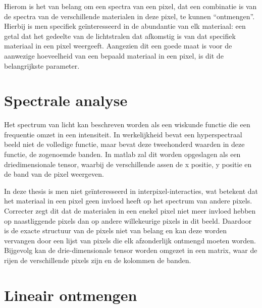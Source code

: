 \documentclass[12pt]{report}
\begin{document}
Hierom is het van belang om een spectra van een pixel, dat een combinatie is van de spectra van de verschillende materialen in deze pixel, te kunnen ``ontmengen''. Hierbij is men specifiek ge\"interesseerd in de abundantie van elk materiaal: een getal dat het gedeelte van de lichtstralen dat afkomstig is van dat specifiek materiaal in een pixel weergeeft. Aangezien dit een goede maat is voor de aanwezige hoeveelheid van een bepaald materiaal in een pixel, is dit de belangrijkste parameter.

\section{Spectrale analyse}

Het spectrum van licht kan beschreven worden als een wiskunde functie die een frequentie omzet in een intensiteit. In werkelijkheid bevat een hyperspectraal beeld niet de volledige functie, maar bevat deze tweehonderd waarden in deze functie, de zogenoemde banden. In matlab\citep{MATLAB} zal dit worden opgeslagen als een driedimensionale tensor, waarbij de verschillende assen de x positie, y positie en de band van de pixel weergeven. 

In deze thesis is men niet ge\"interesseerd in  interpixel-interacties, wat betekent dat het materiaal in een pixel geen invloed heeft op het spectrum van andere pixels. Correcter zegt dit dat de materialen in een enekel pixel niet meer invloed hebben op naastliggende pixels dan op andere willekeurige pixels in dit beeld. Daardoor is de exacte structuur van de pixels niet van belang en kan deze worden vervangen door een lijst van pixels die elk afzonderlijk ontmengd moeten worden.  Bijgevolg kan de drie-dimensionale tensor worden omgezet in een matrix, waar de rijen de verschillende pixels zijn en de kolommen de banden.  






\section{Lineair ontmengen}
\end{document}
